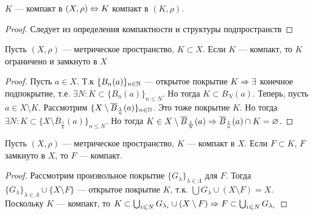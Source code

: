 \begin{note}
    \(K\) --- компакт в \((X, \rho) \Leftrightarrow K\) компакт в \((K, \rho)\).
\end{note}
\begin{proof}
    Следует из определения компактности и структуры подпространств
\end{proof}

\begin{lemma}
    Пусть \((X, \rho)\) --- метрическое пространство, \(K \subset X\). Если \(K\) --- компакт, то \(K\) ограничено и замкнуто в \(X\)
\end{lemma}
\begin{proof}
    Пусть \(a \in X\). Т.к \(\{B_n(a)\}_{n \in \mathbb{N}}\) --- открытое покрытие \(K \Rightarrow \exists\) конечное подпокрытие, т.е. \(\exists N: K \subset \{B_n(a)\}_{n \le N}\). Но тогда \(K \subset B_N(a)\).
    Теперь, пусть \(a \in X \setminus K\). Рассмотрим \(\{X \setminus \overline{B}_\frac{1}{n}(a)\}_{n \in \mathbb{N}}\). Это тоже покрытие \(K\). Но тогда \(\exists N: K \subset \{X \setminus \overline{B}_{\frac{1}{n}}(a)\}_{n \le N}\). Но тогда \(K \in X \setminus \overline{B}_{\frac{1}{N}}(a) \Rightarrow \overline{B}_{\frac{1}{n}}(a) \cap K = \varnothing\).
\end{proof}

\begin{lemma}
    Пусть \((X, \rho)\) --- метрическое пространство, \(K\) --- компакт в \(X\). Если \(F \subset K\), \(F\) замкнуто в \(X\), то \(F\) --- компакт.
\end{lemma}
\begin{proof}
    Рассмотрим произвольное покрытие \(\{G_\lambda\}_{\lambda \in \Lambda}\) для \(F\). Тогда \(\{G_\lambda\}_{\lambda \in \Lambda} \cup \{X \setminus F\}\) --- открытое покрытие \(K\), т.к. \(\bigcup G_\lambda \cup (X \setminus F) = X\). Поскольку \(K\) --- компакт, то \(K \subset \bigcup_{i \leqslant N} G_{\lambda_i} \cup (X \setminus F) \Rightarrow F \subset \bigcup_{i \leqslant N} G_{\lambda_i}\)
\end{proof}

